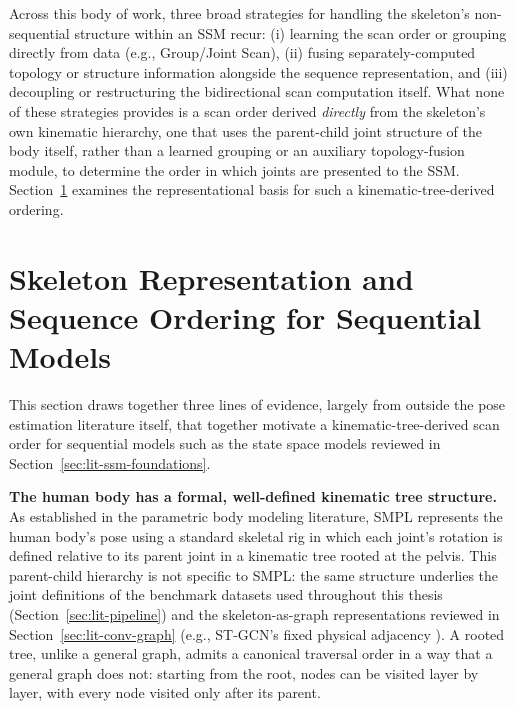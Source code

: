 Across this body of work, three broad strategies for handling the
skeleton's non-sequential structure within an SSM recur: (i) learning the
scan order or grouping directly from data (e.g., Group/Joint Scan), (ii)
fusing separately-computed topology or structure information alongside the
sequence representation, and (iii) decoupling or restructuring the
bidirectional scan computation itself. What none of these strategies
provides is a scan order derived \emph{directly}
from the skeleton's own kinematic hierarchy, one that uses the
parent-child joint structure of the body itself, rather than a learned
grouping or an auxiliary topology-fusion module, to determine the order in
which joints are presented to the SSM. Section~\ref{sec:lit-skeleton-ordering} examines
the representational basis for such a kinematic-tree-derived ordering.

\section{Skeleton Representation and Sequence Ordering for Sequential Models}
\label{sec:lit-skeleton-ordering}

This section draws together three lines of evidence, largely from outside
the pose estimation literature itself, that together motivate a
kinematic-tree-derived scan order for sequential models such as the
state space models reviewed in Section~\ref{sec:lit-ssm-foundations}.

\textbf{The human body has a formal, well-defined kinematic tree
structure.} As established in the parametric body modeling literature,
SMPL \cite{loper2015smpl} represents the human body's pose using a
standard skeletal rig in which each joint's rotation is defined relative
to its parent joint in a kinematic tree rooted at the pelvis. This
parent-child hierarchy is not specific to SMPL: the same structure
underlies the joint definitions of the benchmark datasets used
throughout this thesis (Section~\ref{sec:lit-pipeline}) and the
skeleton-as-graph representations reviewed in
Section~\ref{sec:lit-conv-graph} (e.g., ST-GCN's fixed physical adjacency
\cite{yan2018stgcn}). A rooted tree, unlike a general graph, admits a
canonical traversal order in a way that a general graph does not: starting
from the root, nodes can be visited layer by layer, with every node
visited only after its parent.

